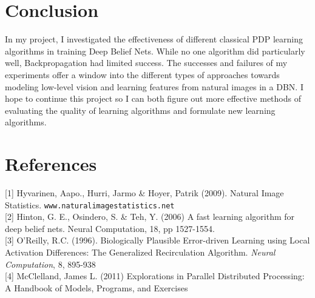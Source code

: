 \documentclass{article} %
\begin{document}
\section{Conclusion}

In my project, I investigated the effectiveness of different classical PDP learning algorithms in training Deep Belief Nets. While no one algorithm did particularly well, Backpropagation had limited success. The successes and failures of my experiments offer a window into the different types of approaches towards modeling low-level vision and learning features from natural images in a DBN. I hope to continue this project so I can both figure out more effective methods of evaluating the quality of learning algorithms and formulate new learning algorithms.




\section{References}
\small{
[1] Hyvarinen, Aapo., Hurri, Jarmo \& Hoyer, Patrik (2009). Natural Image Statistics. \texttt{www.naturalimagestatistics.net} \\
}
\small{
[2] Hinton, G. E., Osindero, S. \& Teh, Y. (2006)
A fast learning algorithm for deep belief nets.
Neural Computation, 18, pp 1527-1554. \\
}
\small{
[3] O'Reilly, R.C. (1996). Biologically Plausible Error-driven Learning using Local Activation Differences: The Generalized Recirculation Algorithm. \textit{Neural Computation}, 8, 895-938 \\
}
\small{
[4] McClelland, James L. (2011) Explorations in Parallel Distributed Processing: A Handbook of Models, Programs, and Exercises
}
\end{document}
